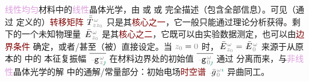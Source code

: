\textcolor{Plum}{线性}\textcolor{Plum}{均匀}材料中的\textcolor{Plum}{线性}\textcolor{PineGreen}{晶体光学}，由  或  或  完全描述（包含全部信息）。可见（通过  定义的）\textcolor{Maroon}{转移矩阵} $\xint{\mathcolor{gray}{-}}{30}{\bar{\bar{T}}}^{\;\!\mathcolor{gray}{\omega}}_{\;\! \mathcolor{gray}{z} \mathcolor{gray}{z_0}}$ 只是其\textcolor{Maroon}{核心之一}，它一般只能通过理论分析获得。剩下的一个未知\textcolor{NavyBlue}{物理量} $\xint{\mathcolor{gray}{-}}{25}{\bar{E}}^{\;\!\mathcolor{gray}{\omega}}_{\;\! \mathcolor{gray}{z_0}}$ 是其\textcolor{Maroon}{核心之二}，它既可以由实验数据测定，也可以由\textcolor{Maroon}{边界条件}  确定，或者/甚至（被）直接设定。当 $\mathcolor{gray}{z_0} = \mathcolor{gray}{0}$ 时，$\xint{\mathcolor{gray}{-}}{25}{\bar{E}}^{\;\!\mathcolor{gray}{\omega}}_{\;\! \mathcolor{gray}{z_0}} = \xint{\mathcolor{gray}{-}}{25}{\bar{E}}^{\;\!\mathcolor{gray}{\omega}}_{\;\! \mathcolor{gray}{0}}$ 来源于从原本的  中的 \textcolor{PineGreen}{本征复振幅} $\overline{\xint{\begin{smallmatrix} ~ \\ {}^{}_{\mathcolor{gray}{-}} \\ ~ \end{smallmatrix}}{09}{\mathtt{g}}^{\;\!\mathcolor{gray}{\omega}}_{\;\! \mathcolor{gray}{z} \textcolor{PineGreen}{\jmath}}}$ 在材料边界处的初始值 $\overline{\xint{\begin{smallmatrix} ~ \\ {}^{}_{\mathcolor{gray}{-}} \\ ~ \end{smallmatrix}}{09}{\mathtt{g}}^{\;\!\mathcolor{gray}{\omega}}_{\;\! \mathcolor{gray}{0} \textcolor{PineGreen}{\jmath}}}$ 通过  分离而来，与\textcolor{Plum}{非线性}\textcolor{PineGreen}{晶体光学}的解  中的通解/常量部分：初始电场\textcolor{Maroon}{时空谱} $\xint{{}^{}_{\mathcolor{gray}{-}}}{10}{\bar{g}}^{\;\!\mathcolor{gray}{\omega} \textcolor{PineGreen}{\imath}}_{\;\! \mathcolor{gray}{0}}$ 异曲同工。

